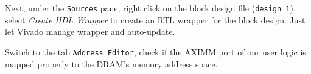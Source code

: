 \documentclass[11pt]{article}
\begin{document}
\begin{appendices}
\begin{center}
\end{center}

Next, under the \texttt{Sources} pane, right click on the block design file (\verb|design_1|), select \emph{Create HDL Wrapper} to create an RTL wrapper for the block design. Just let Vivado manage wrapper and auto-update.

\begin{center}
\end{center}

Switch to the tab \texttt{Address Editor}, check if the AXIMM port of our user logic is mapped properly to the DRAM's memory address space.

\begin{center}
\end{center}


\end{appendices}
\end{document}
